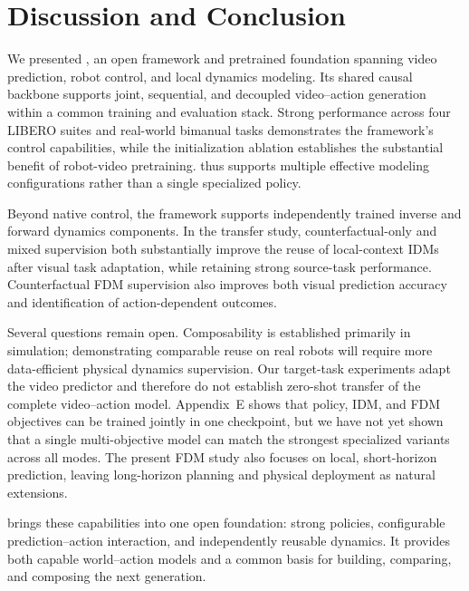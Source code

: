 \section{Discussion and Conclusion}
\label{sec:discussion}

We presented \ours, an open framework and pretrained foundation spanning
video prediction, robot control, and local dynamics modeling. Its shared
causal backbone supports joint, sequential, and decoupled video--action
generation within a common training and evaluation stack. Strong performance
across four LIBERO suites and real-world bimanual tasks demonstrates the
framework's control capabilities, while the initialization ablation
establishes the substantial benefit of robot-video pretraining. \ours
thus supports multiple effective modeling configurations rather than a
single specialized policy.

Beyond native control, the framework supports independently trained
inverse and forward dynamics components. In the transfer study,
counterfactual-only and mixed supervision both substantially improve the
reuse of local-context IDMs after visual task adaptation, while retaining
strong source-task performance. Counterfactual FDM supervision also improves both visual prediction accuracy and
identification of action-dependent outcomes.

Several questions remain open. Composability is established primarily in
simulation; demonstrating comparable reuse on real robots will require more
data-efficient physical dynamics supervision. Our target-task experiments
adapt the video predictor and therefore do not establish zero-shot transfer of
the complete video--action model. Appendix~E shows that policy, IDM, and FDM
objectives can be trained jointly in one checkpoint, but we have not yet shown
that a single multi-objective model can match the strongest specialized
\ours variants across all modes. The present FDM study also focuses on local,
short-horizon prediction, leaving long-horizon planning and physical deployment
as natural extensions.

\ours brings these capabilities into one open foundation: strong
policies, configurable prediction--action interaction, and independently
reusable dynamics. It provides both capable world--action models and a
common basis for building, comparing, and composing the next generation.

\FloatBarrier

{
    \small

}

